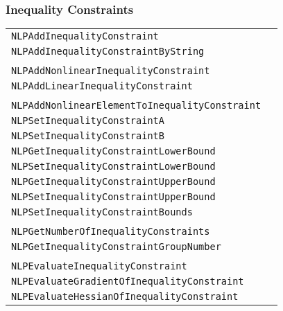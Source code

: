 \documentclass[12pt]{article}
\begin{document}
\subsubsection{Inequality Constraints}
\begin{center}
\begin{tabular}{ll}
\tt NLPAddInequalityConstraint&\pageref{Subroutine:NLPAddInequalityConstraint}\\
\tt NLPAddInequalityConstraintByString&\pageref{Subroutine:NLPAddInequalityConstraintByString}\\
\\
\tt NLPAddNonlinearInequalityConstraint&\pageref{Subroutine:NLPAddNonlinearInequalityConstraint}\\
\tt NLPAddLinearInequalityConstraint&\pageref{Subroutine:NLPAddLinearInequalityConstraint}\\
\\
\tt NLPAddNonlinearElementToInequalityConstraint&\pageref{Subroutine:NLPAddNonlinearElementToInequalityConstraint}\\
\tt NLPSetInequalityConstraintA&\pageref{Subroutine:NLPSetInequalityConstraintA}\\
\tt NLPSetInequalityConstraintB&\pageref{Subroutine:NLPSetInequalityConstraintB}\\
\tt NLPGetInequalityConstraintLowerBound&\pageref{Subroutine:NLPGetInequalityConstraintLowerBound}\\
\tt NLPSetInequalityConstraintLowerBound&\pageref{Subroutine:NLPSetInequalityConstraintLowerBound}\\
\tt NLPGetInequalityConstraintUpperBound&\pageref{Subroutine:NLPGetInequalityConstraintUpperBound}\\
\tt NLPSetInequalityConstraintUpperBound&\pageref{Subroutine:NLPSetInequalityConstraintUpperBound}\\
\tt NLPSetInequalityConstraintBounds&\pageref{Subroutine:NLPSetInequalityConstraintBounds}\\
\\
\tt NLPGetNumberOfInequalityConstraints&\pageref{Subroutine:NLPGetNumberOfInequalityConstraints}\\
\tt NLPGetInequalityConstraintGroupNumber&\pageref{Subroutine:NLPGetInequalityConstraintGroupNumber}\\
\\
\tt NLPEvaluateInequalityConstraint&\pageref{Subroutine:NLPEvaluateInequalityConstraint}\\
\tt NLPEvaluateGradientOfInequalityConstraint&\pageref{Subroutine:NLPEvaluateGradientOfInequalityConstraint}\\
\tt NLPEvaluateHessianOfInequalityConstraint&\pageref{Subroutine:NLPEvaluateHessianOfInequalityConstraint}\\
\end{tabular}
\end{center}
\end{document}
